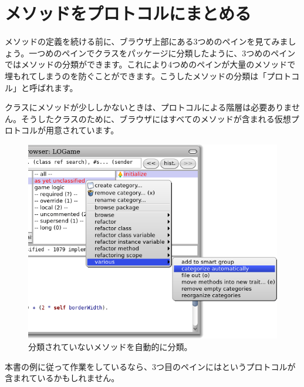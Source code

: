 \documentclass[a4paper,10pt,twoside]{book}
\begin{document}

\section{メソッドをプロトコルにまとめる}

メソッドの定義を続ける前に、ブラウザ上部にある3つめのペインを見てみましょう。一つめのペインでクラスをパッケージに分類したように、3つめのペインではメソッドの分類ができます。これにより4つめのペインが大量のメソッドで埋もれてしまうのを防ぐことができます。こうしたメソッドの分類は「プロトコル」と呼ばれます。


クラスにメソッドが少ししかないときは、プロトコルによる階層は必要ありません。そうしたクラスのために、ブラウザにはすべてのメソッドが含まれる仮想プロトコルが用意されています。


\begin{figure}[htbp]
   \centering
   \includegraphics[width=\textwidth]{Categorize}
   \caption{分類されていないメソッドを自動的に分類。 }
\end{figure}

本書の例に従って作業をしているなら、3つ目のペインにはというプロトコルが含まれているかもしれません。
\end{document}
